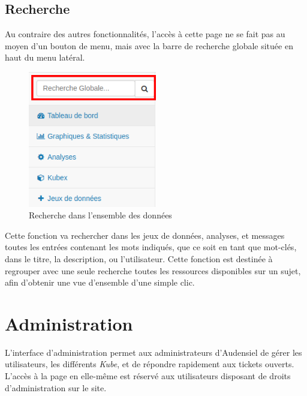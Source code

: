 \documentclass[a4paper]{report}
\begin{document}

\subsection{Recherche}
\label{subsec:search}

Au contraire des autres fonctionnalités, l'accès à cette page ne se fait pas au moyen d'un bouton de menu, mais avec la barre de recherche globale située en haut du menu latéral.

\begin{figure}[h!]
	\centering
	\includegraphics[width=0.5\textwidth]{images/globalSearch.png}
	\caption{\label{fig:globalSearch} Recherche dans l'ensemble des données}
\end{figure}

Cette fonction va rechercher dans les jeux de données, analyses, et messages toutes les entrées contenant les mots indiqués, que ce soit en tant que mot-clés, dans le titre, la description, ou l'utilisateur. Cette fonction est destinée à regrouper avec une seule recherche toutes les ressources disponibles sur un sujet, afin d'obtenir une vue d'ensemble d'une simple clic.


\section{Administration}
\label{sec:admin}

L'interface d'administration permet aux administrateurs d'Audensiel de gérer les utilisateurs, les différents \emph{Kube}, et de répondre rapidement aux tickets ouverts. L'accès à la page en elle-même est réservé aux utilisateurs disposant de droits d'administration sur le site.
\end{document}
